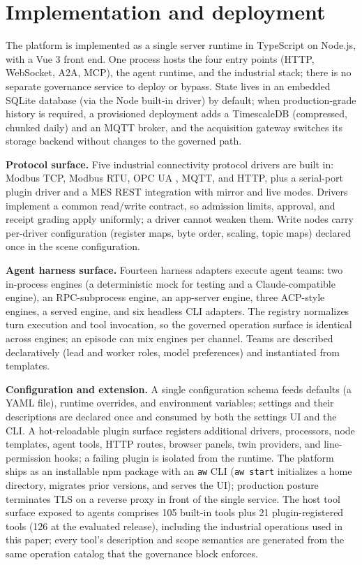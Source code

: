 \section{Implementation and deployment}
\label{sec:impl}

The platform is implemented as a single server runtime in TypeScript on
Node.js, with a Vue 3 front end. One process hosts the four entry points
(HTTP, WebSocket, A2A, MCP), the agent runtime, and the industrial stack;
there is no separate governance service to deploy or bypass. State lives
in an embedded SQLite database (via the Node built-in driver) by default;
when production-grade history is required, a provisioned deployment adds a
TimescaleDB (compressed, chunked daily) and an MQTT broker, and the
acquisition gateway switches its storage backend without changes to the
governed path.

\textbf{Protocol surface.} Five industrial connectivity protocol drivers
are built in:
Modbus TCP, Modbus RTU, OPC UA \cite{iec62541}, MQTT, and HTTP, plus a
serial-port plugin driver and a MES REST integration with mirror and live
modes. Drivers implement a common read/write contract, so admission
limits, approval, and receipt grading apply uniformly; a driver cannot
weaken them. Write nodes carry per-driver configuration (register maps,
byte order, scaling, topic maps) declared once in the scene configuration.

\textbf{Agent harness surface.} Fourteen harness adapters execute agent
teams: two in-process engines (a deterministic mock for testing and a
Claude-compatible engine), an RPC-subprocess engine, an app-server engine,
three ACP-style engines, a served engine, and six headless CLI adapters.
The registry normalizes turn execution and tool invocation, so the
governed operation surface is identical across engines; an episode can mix
engines per channel. Teams are described declaratively (lead and worker
roles, model preferences) and instantiated from templates.

\textbf{Configuration and extension.} A single configuration schema feeds
defaults (a YAML file), runtime overrides, and environment variables;
settings and their descriptions are declared once and consumed by both the
settings UI and the CLI. A hot-reloadable plugin surface registers
additional drivers, processors, node templates, agent tools, HTTP routes,
browser panels, twin providers, and line-permission hooks; a failing
plugin is isolated from the runtime. The platform ships as an installable
npm package with an \texttt{aw} CLI (\texttt{aw start} initializes a home
directory, migrates prior versions, and serves the UI); production
posture terminates TLS on a reverse proxy in front of the single service.
The host tool surface exposed to agents comprises 105 built-in tools plus 21
plugin-registered tools (126 at the evaluated release), including the
industrial operations used in this paper; every tool's description and
scope semantics are generated from the same operation catalog that the
governance block enforces.

